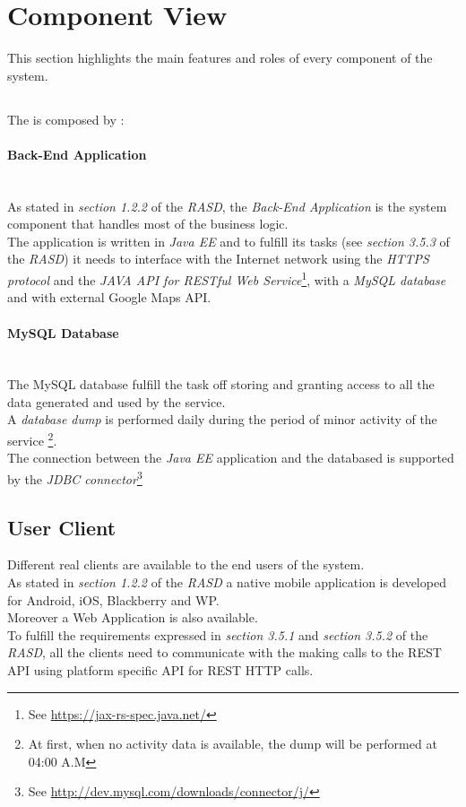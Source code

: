 \section{Component View} %
\label{sec:component_view}
This section highlights the main features and roles of every component of the system.
\subsection{} %
\label{sub:nameref_}
The  is composed by :

\paragraph{Back-End Application} %
\label{par:back_end_application}\hfill \\
As stated in \emph{section 1.2.2} of the \emph{RASD}, the \emph{Back-End Application} is the system component that handles most of the business logic.\\
The application is written in \emph{Java EE} and to fulfill its tasks (see \emph{section 3.5.3} of the \emph{RASD}) it needs to interface with the Internet network using the \emph{HTTPS protocol} and the \emph{JAVA API for RESTful Web Service}\footnote{See \url{https://jax-rs-spec.java.net/}}, with a \emph{MySQL database} and with external Google Maps API.\\

\paragraph{MySQL Database} %
\label{par:mysql_database}\hfill \\
The MySQL database fulfill the task off storing and granting access to all the data generated and used by the service.\\
A \emph{database dump} is performed daily during the period of minor activity of the service \footnote{At first, when no activity data is available, the dump will be performed at 04:00 A.M}.\\
The connection between the \emph{Java EE} application and the databased is supported by the \emph{JDBC connector}\footnote{See \url{http://dev.mysql.com/downloads/connector/j/}}\\

\subsection{User Client} %
\label{sub:user_client}
Different real clients are available to the end users of the system.\\
As stated in \emph{section 1.2.2} of the \emph{RASD} a native mobile application is developed for Android, iOS, Blackberry and WP.\\
Moreover a Web Application is also available.\\
To fulfill the requirements expressed in \emph{section 3.5.1} and \emph{section 3.5.2} of the \emph{RASD}, all the clients need to communicate with the  making calls to the REST API using platform specific API for REST HTTP calls.







